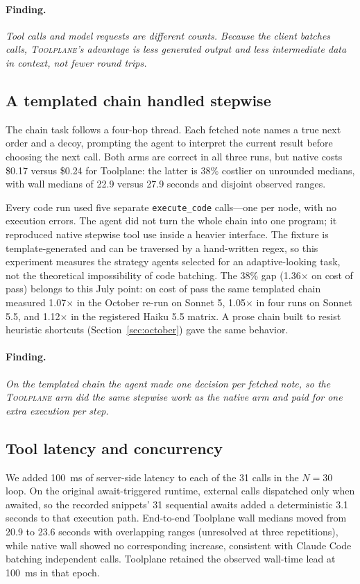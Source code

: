 \documentclass[10pt,twocolumn]{article}
\newcommand{\toolplane}{\textsc{Toolplane}\xspace}
\newcommand{\usd}[1]{\$#1}
\newcommand{\finding}[1]{\paragraph{Finding.} \emph{#1}}
\begin{document}
\finding{Tool calls and model requests are different counts.  Because the client
batches calls, \toolplane's advantage is less generated output and less
intermediate data in context, not fewer round trips.}



\subsection{A templated chain handled stepwise}
\label{sec:chain}

The chain task follows a four-hop thread.  Each fetched note names a true next
order and a decoy, prompting the agent to interpret the current result before
choosing the next call.  Both arms are correct in all three runs, but native
costs \usd{0.17} versus \usd{0.24} for Toolplane: the latter is 38\% costlier
on unrounded medians, with wall medians of 22.9 versus 27.9 seconds and
disjoint observed ranges.

Every code run used five separate \texttt{execute\_code} calls---one per node,
with no execution errors.  The agent did not turn the whole chain into one
program; it reproduced native stepwise tool use inside a heavier interface.
The fixture is template-generated and can be traversed by a hand-written
regex, so this experiment measures the strategy agents selected for an
adaptive-looking task, not the theoretical impossibility of code batching.
The 38\% gap (1.36$\times$ on cost of pass) belongs to this July point: on
cost of pass the same templated chain measured 1.07$\times$ in the October
re-run on Sonnet 5, 1.05$\times$ in four runs on Sonnet 5.5, and 1.12$\times$
in the registered Haiku 5.5 matrix.  A prose chain built to resist
heuristic shortcuts (Section~\ref{sec:october}) gave the same behavior.

\finding{On the templated chain the agent made one decision per fetched note, so the
\toolplane arm did the same stepwise work as the native arm and paid for one
extra execution per step.}

\subsection{Tool latency and concurrency}
\label{sec:latency}

We added 100~ms of server-side latency to each of the 31 calls in the
$N=30$ loop.  On the original await-triggered runtime, external calls
dispatched only when awaited, so the recorded snippets' 31 sequential awaits
added a deterministic 3.1 seconds to that execution path.  End-to-end
Toolplane wall medians moved from 20.9 to 23.6 seconds with overlapping
ranges (unresolved at three repetitions), while native wall showed no
corresponding increase, consistent with Claude Code batching independent
calls.  Toolplane retained the observed wall-time lead at 100~ms in that
epoch.
\end{document}
